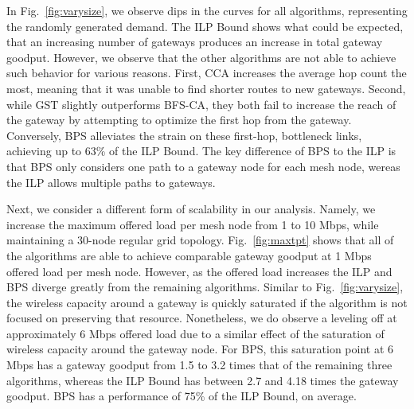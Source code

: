 In Fig.~\ref{fig:varysize}, we observe dips in the curves for all algorithms, 
representing the randomly generated demand.  The ILP Bound shows what could be
expected, that an increasing number of gateways produces an increase in total
gateway goodput.  However, we observe that the other algorithms are not able
to achieve such behavior for various reasons.  First, CCA increases the average
hop count the most, meaning that it was unable to find shorter routes to new
gateways.  Second, while GST slightly outperforms BFS-CA, they both fail to 
increase the reach of the gateway by attempting to optimize the first hop from
the gateway. Conversely, BPS alleviates the strain on these first-hop, bottleneck 
links, achieving up to 63\% of the ILP Bound. The key difference of BPS to the
ILP is that BPS only considers one path to a gateway node for each mesh node,
wereas the ILP allows multiple paths to gateways.

Next, we consider a different form of scalability in our analysis.  Namely,
we increase the maximum offered load per mesh node from 1 to 10 Mbps, while
maintaining a 30-node regular grid topology. Fig.~\ref{fig:maxtpt} shows that
all of the algorithms are able to achieve comparable gateway goodput at 1 Mbps
offered load per mesh node.  However, as the offered load increases the ILP
and BPS diverge greatly from the remaining algorithms. Similar to 
Fig.~\ref{fig:varysize}, the wireless capacity around a gateway is quickly 
saturated if the algorithm is not focused on preserving that resource. Nonetheless,
we do observe a leveling off at approximately 6 Mbps offered load due to a
similar effect of the saturation of wireless capacity around the gateway node.
For BPS, this saturation point at 6 Mbps has a gateway goodput from 1.5 to 3.2 
times that of the remaining three algorithms, whereas the ILP Bound has between
2.7 and 4.18 times the gateway goodput. BPS has a performance of 75\% of the ILP
Bound, on average.

 


